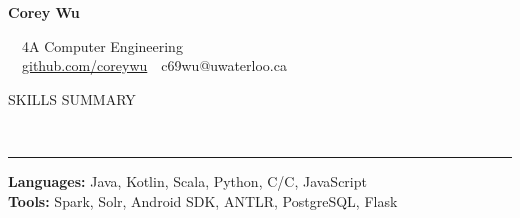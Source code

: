 \documentclass[11pt, letterpaper, oneside]{article}
\makeatletter
\newcommand{\name}{Corey Wu}
\newcommand{\program}{4A Computer Engineering}
\newcommand{\github}{\href{https://github.com/coreywu}{github.com/coreywu}}
\newcommand{\email}{c69wu@uwaterloo.ca}
\newcommand{\HRule}[2]{\textcolor{#1}{\rule{\linewidth}{#2}}}
\newcommand{\sectiontitle}[1]{\begin{minipage}{\textwidth}\vspace{-7.5pt}\begin{flushleft}\hspace{-20.5pt}\vspace{-25pt}
\Large\MakeUppercase{#1}\end{flushleft}\end{minipage}\\\HRule{black}{0.15mm}\vspace{\baselineskip}}
\newenvironment{ressection}[1]{
  \sectiontitle{#1}}
  {\vspace{-\baselineskip}}
\newcommand{\CPP}
{C\nolinebreak[4]\hspace{-.05em}\raisebox{.22ex}{\footnotesize\bf ++}}
\makeatother
\begin{document}
\begin{center}

	{\Huge \textbf{\name}}

	\ \ {\Large{\program}} \\
	\ \ \github \ \textbullet \ \email \ \
\end{center}

\vspace{-10pt}

\begin{ressection}{Skills Summary}\vspace{-12pt}
  \hspace{-20pt} \textbf{Languages:} Java, Kotlin, Scala, Python, C/\CPP, JavaScript \\
  \hspace{-20pt} \textbf{Tools:} Spark, Solr, Android SDK, ANTLR,  PostgreSQL, Flask
\end{ressection}

\vspace{20pt}
\end{document}
